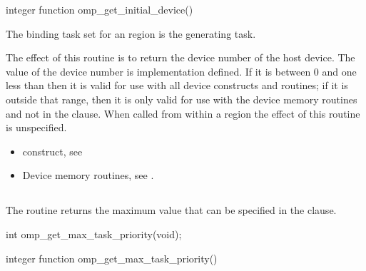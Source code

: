 \begin{fortranspecific}
\begin{boxedcode}
integer function omp\_get\_initial\_device()
\end{boxedcode}
\end{fortranspecific}

\binding
The binding task set for an  region is the generating task.

\effect
The effect of this routine is to return the device number of the host device.
The value of the device number is implementation defined. If it is between 0 
and one less than  then it is valid for use 
with all device constructs and routines; if it is outside that range, then 
it is only valid for use with the device memory routines and not in the 
 clause. When called from within a  region 
the effect of this routine is unspecified.

\crossreferences
\begin{itemize}
\item {} construct, see 

\item Device memory routines, see .
\end{itemize}




\subsection{}
\label{subsec:omp_get_max_task_priority}
\summary

The  routine returns the maximum value that can be
specified in the  clause.

\pagebreak

\begin{samepage}
\format
\begin{ccppspecific}
\begin{boxedcode}
int omp\_get\_max\_task\_priority(void);
\end{boxedcode}
\end{ccppspecific}
\end{samepage}

\begin{fortranspecific}
\begin{boxedcode}
integer function omp\_get\_max\_task\_priority()
\end{boxedcode}
\end{fortranspecific}

